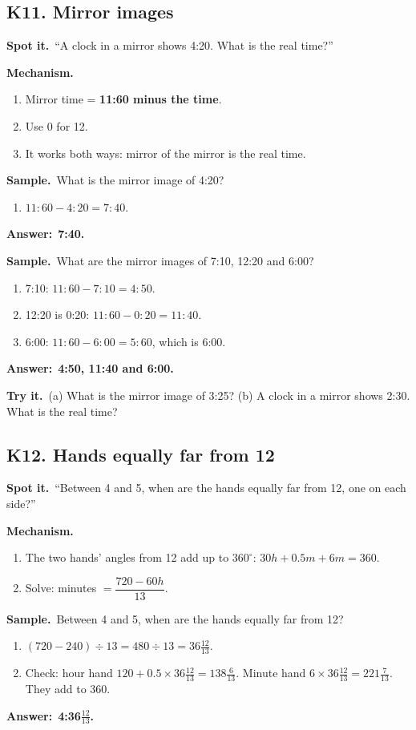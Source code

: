 \documentclass[11pt,a4paper]{article}
\let\oldsubsection\subsection
\renewcommand{\subsection}{\needspace{9\baselineskip}\oldsubsection}
\newcommand{\spot}{\textbf{\color{ember}Spot it.}\ }
\newcommand{\mech}{\textbf{\color{ember}Mechanism.}\ }
\newif\ifkeepsamp
\newcommand{\ans}[1]{\par\nopagebreak\noindent\textbf{\color{ember}Answer:}\ \textbf{#1}\par}
\newcommand{\samp}{\ifkeepsamp\needspace{4\baselineskip}\fi\textbf{\color{ember}Sample.}\ }
\newcommand{\tryit}[1]{\textbf{\color{ember}Try it.}\ #1}
\begin{document}
\subsection{K11. Mirror images}
\spot ``A clock in a mirror shows 4:20. What is the real time?''

\mech
\begin{enumerate}
\item Mirror time = \textbf{11:60 minus the time}.
\item Use 0 for 12.
\item It works both ways: mirror of the mirror is the real time.
\end{enumerate}

\samp What is the mirror image of 4:20?
\begin{enumerate}
\item $11{:}60 - 4{:}20 = 7{:}40$.
\end{enumerate}
\ans{7:40.}

\samp What are the mirror images of 7:10, 12:20 and 6:00?
\begin{enumerate}
\item 7:10: $11{:}60 - 7{:}10 = 4{:}50$.
\item 12:20 is 0:20: $11{:}60 - 0{:}20 = 11{:}40$.
\item 6:00: $11{:}60 - 6{:}00 = 5{:}60$, which is 6:00.
\end{enumerate}
\ans{4:50, 11:40 and 6:00.}

\tryit (a) What is the mirror image of 3:25? (b) A clock in a mirror shows 2:30. What is the real time?

\subsection{K12. Hands equally far from 12}
\spot ``Between 4 and 5, when are the hands equally far from 12, one on each side?''

\mech
\begin{enumerate}
\item The two hands' angles from 12 add up to $360^\circ$: $30h + 0.5m + 6m = 360$.
\item Solve: minutes $= \dfrac{720 - 60h}{13}$.
\end{enumerate}

\samp Between 4 and 5, when are the hands equally far from 12?
\begin{enumerate}
\item $(720 - 240) \div 13 = 480 \div 13 = 36\tfrac{12}{13}$.
\item Check: hour hand $120 + 0.5 \times 36\tfrac{12}{13} = 138\tfrac6{13}$. Minute hand $6 \times 36\tfrac{12}{13} = 221\tfrac7{13}$. They add to 360.
\end{enumerate}
\ans{4:36$\tfrac{12}{13}$.}
\end{document}
